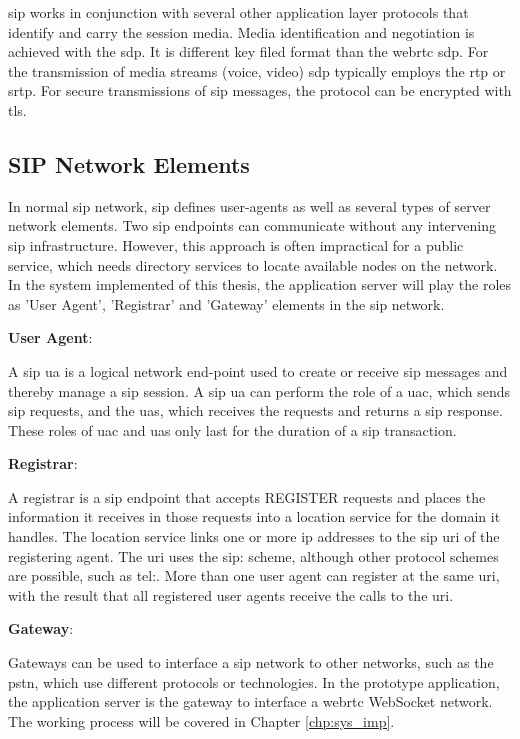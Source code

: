 \par \gls{sip} works in conjunction with several other application layer protocols that identify and carry the session media. Media identification and negotiation is achieved with the \gls{sdp}. It is different key filed format than the \gls{webrtc} \gls{sdp}. For the transmission of media streams (voice, video) \gls{sdp} typically employs the \gls{rtp} or \gls{srtp}. For secure transmissions of \gls{sip} messages, the protocol can be encrypted with \gls{tls}.

\subsection{SIP Network Elements}
\noindent In normal \gls{sip} network, \gls{sip} defines user-agents as well as several types of server network elements. Two \gls{sip} endpoints can communicate without any intervening \gls{sip} infrastructure. However, this approach is often impractical for a public service, which needs directory services to locate available nodes on the network. In the system implemented of this thesis, the application server will play the roles as 'User Agent', 'Registrar' and 'Gateway' elements in the \gls{sip} network.

\noindent \textbf{User Agent}\cite{wiki:sip}:
\par A \gls{sip} \gls{ua} is a logical network end-point used to create or receive \gls{sip} messages and thereby manage a \gls{sip} session. A \gls{sip} \gls{ua} can perform the role of a \gls{uac}, which sends \gls{sip} requests, and the \gls{uas}, which receives the requests and returns a \gls{sip} response. These roles of \gls{uac} and \gls{uas} only last for the duration of a \gls{sip} transaction.

\noindent \textbf{Registrar}\cite{wiki:sip}:
\par A registrar is a \gls{sip} endpoint that accepts REGISTER requests and places the information it receives in those requests into a location service for the domain it handles. The location service links one or more \gls{ip} addresses to the \gls{sip} \gls{uri} of the registering agent. The \gls{uri} uses the sip: scheme, although other protocol schemes are possible, such as tel:. More than one user agent can register at the same \gls{uri}, with the result that all registered user agents receive the calls to the \gls{uri}.

\noindent \textbf{Gateway}\cite{wiki:sip}:
\par Gateways can be used to interface a \gls{sip} network to other networks, such as the \gls{pstn}, which use different protocols or technologies. In the prototype application, the application server is the gateway to interface a \gls{webrtc} WebSocket network. The working process will be covered in Chapter \ref{chp:sys_imp}.

